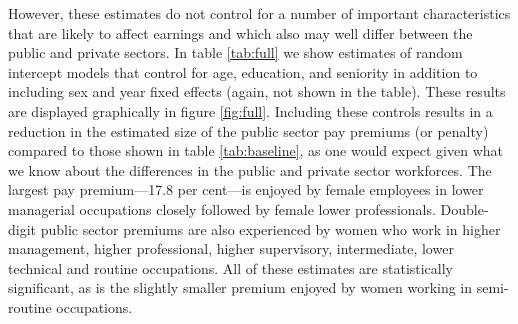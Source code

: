 \documentclass[a4paper,11pt,titlepage]{article}
\begin{document}
However, these estimates do not control for a number of important characteristics
that are likely to affect earnings and which also may well differ between the public and
private sectors. In table \ref{tab:full} we show estimates of random intercept models that control
for age, education, and seniority in addition to including sex and year fixed effects (again, not shown in the table). These results are displayed graphically in figure \ref{fig:full}. Including these controls results in a reduction in the estimated size of the public sector pay premiums (or penalty) compared to those shown in table \ref{tab:baseline}, as one would expect given what we know about the differences in the public and private sector workforces.  The largest pay premium---17.8 per cent---is enjoyed by female employees in lower managerial occupations closely followed by female lower professionals.
Double-digit public sector premiums are also experienced by women who work in higher management, higher professional, higher supervisory, intermediate, lower technical and routine occupations.  All of these estimates are statistically significant, as is the slightly smaller premium enjoyed by women working in semi-routine occupations.
\end{document}
